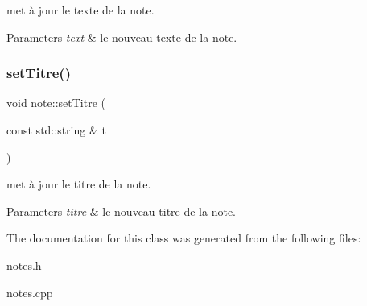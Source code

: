 met à jour le texte de la note. 


\begin{DoxyParams}{Parameters}
{\em text} & le nouveau texte de la note. \\
\hline
\end{DoxyParams}
\mbox{\label{classnote_a70884d3640a6f4440ddb9bd30925b5e7}} 
\subsubsection{\texorpdfstring{set\+Titre()}{setTitre()}}
{\footnotesize\ttfamily void note\+::set\+Titre (\begin{DoxyParamCaption}\item[{const std\+::string \&}]{t }\end{DoxyParamCaption})\hspace{0.3cm}{\ttfamily [inline]}}



met à jour le titre de la note. 


\begin{DoxyParams}{Parameters}
{\em titre} & le nouveau titre de la note. \\
\hline
\end{DoxyParams}


The documentation for this class was generated from the following files\+:\begin{DoxyCompactItemize}
\item 
notes.\+h\item 
notes.\+cpp\end{DoxyCompactItemize}
